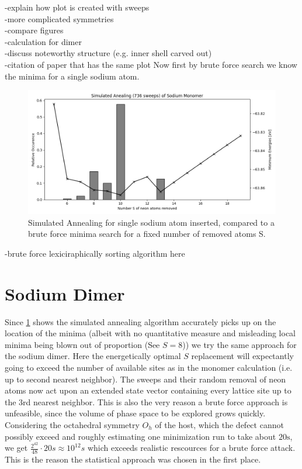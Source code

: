 -explain how plot is created with sweeps\\
-more complicated symmetries\\
-compare figures\\
-calculation for dimer\\
-discuss noteworthy structure (e.g. inner shell carved out)\\
-citation of paper that has the same plot
Now first by brute force search we know the minima for a single sodium atom.


\begin{figure}[h!]
	\centering
	\includegraphics[scale=0.5]{./Inhalt/Bilder/optimal_defect_simulated_annealing.png}
	\caption{Simulated Annealing for single sodium atom inserted, compared to a brute force minima search for a fixed number of removed atoms S.}
	\label{fig:simulatedannealingsodium}
\end{figure}  



-brute force lexiciraphically sorting algorithm here

\section{Sodium Dimer}
Since \ref{fig:simulatedannealingsodium} shows the simulated annealing algorithm accurately picks up on the location of the minima (albeit with no quantitative measure and misleading local minima being blown out of proportion (See $S=8$)) we try the same approach for the sodium dimer. Here the energetically optimal $S$ replacement will expectantly going to exceed the number of available sites as in the monomer calculation (i.e. up to second nearest neighbor). The sweeps and their random removal of neon atoms now act upon an extended state vector containing every lattice site up to the 3rd nearest neighbor. This is also the very reason a brute force approach is unfeasible, since the volume of phase space to be explored grows quickly. Considering the octahedral symmetry $O_h$ of the host, which the defect cannot possibly exceed and roughly estimating one minimization run to take about $20\si{\second}$, we get $\frac{2^{42}}{48}\cdot20s\approx10^{12}s$ which exceeds realistic rescources for a brute force attack. This is the reason the statistical approach was chosen in the first place. 

